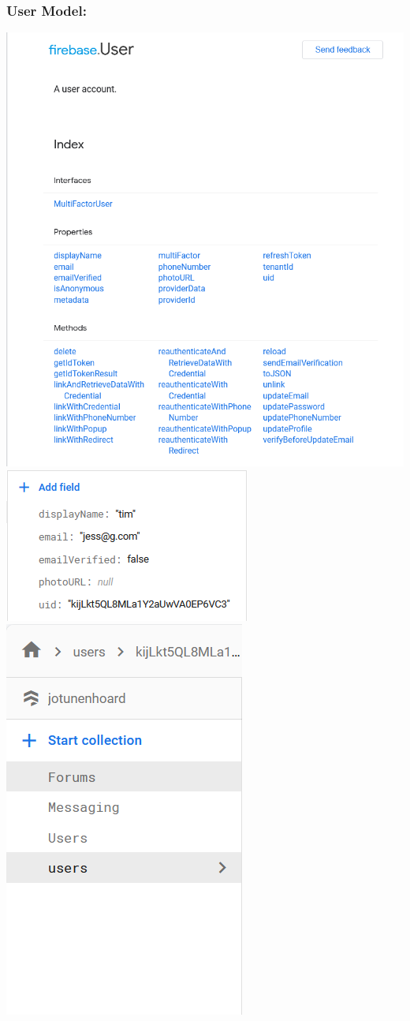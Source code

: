 \subsubsection{User Model:}
\includegraphics[scale=0.3]{./img/firebaseUser.png}
\includegraphics[scale=0.8]{./img/UserValues.png}
\includegraphics[scale=0.3]{./img/Collections.png}
